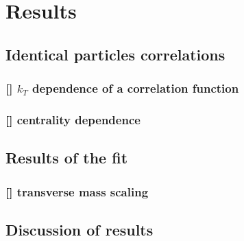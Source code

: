 \chapter{Results}
  \section{Identical particles correlations}
    \subsection{[] $k_T$ dependence of a correlation function}
    \subsection{[] centrality dependence}

  \section{Results of the fit}
    \subsection{[] transverse mass scaling}
  \section{Discussion of results}

